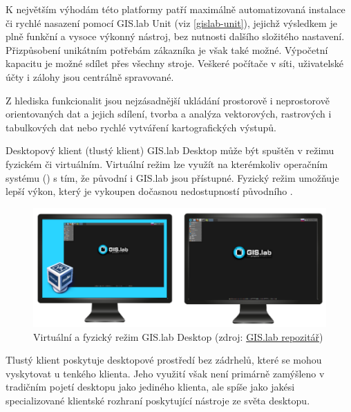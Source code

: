 K největším výhodám této platformy patří maximálně automatizovaná
instalace či rychlé nasazení pomocí GIS.lab Unit (viz
\ref{gislab-unit}), jejichž výsledkem je plně funkční a vysoce výkonný
nástroj, bez nutnosti dalšího složitého nastavení. Přizpůsobení
unikátním potřebám zákazníka je však také možné. Výpočetní kapacitu je
možné sdílet přes všechny stroje. Veškeré počítače v síti, uživatelské
účty i zálohy jsou centrálně spravované.

Z hlediska funkcionalit jsou nejzásadnější ukládání prostorově i
neprostorově orientovaných dat a jejich sdílení, tvorba a analýza
vektorových, rastrových i tabulkových dat nebo rychlé vytváření
kartografických výstupů.

Desktopový klient (tlustý klient) GIS.lab Desktop může být spuštěn v
režimu fyzickém či virtuálním. Virtuální režim lze využít na
kterémkoliv operačním systému () s tím, že původní  i
GIS.lab jsou přístupné. Fyzický režim umožňuje lepší výkon, který je
vykoupen dočasnou nedostupností původního .

\begin{figure}[H] \centering
    \includegraphics[width=450pt]{./pictures/physical-or-virtual-mode.png}
    \caption[Virtuální a fyzický režim GIS.lab Desktop]{Virtuální a fyzický režim GIS.lab Desktop (zdroj:
	\href{https://github.com/gislab-npo/gislab-doc/blob/master/img/installation/physical-or-virtual-mode.png}{GIS.lab repozitář})}
	\label{fig:gislab-rezim}
\end{figure}

Tlustý klient poskytuje desktopové prostředí bez zádrhelů, které se
mohou vyskytovat u tenkého klienta. Jeho využití však není primárně
zamýšleno v tradičním pojetí desktopu jako jediného klienta, ale spíše
jako jakési specializované klientské rozhraní poskytující nástroje ze
světa desktopu.

